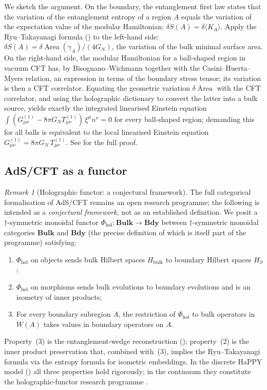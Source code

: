 \documentclass[12pt]{article}
\theoremstyle{definition}
\theoremstyle{remark}
\newtheorem{remark}[theorem]{Remark}
\newcommand{\Area}{\operatorname{Area}}
\begin{document}
We sketch the argument. On the boundary, the entanglement first law states that the variation of the entanglement entropy of a region $A$ equals the variation of the expectation value of the modular Hamiltonian: $\delta S(A) = \delta \langle K_A\rangle$. Apply the Ryu--Takayanagi formula () to the left-hand side: $\delta S(A) = \delta\Area(\gamma_A)/(4G_N)$, the variation of the bulk minimal surface area. On the right-hand side, the modular Hamiltonian for a ball-shaped region in vacuum CFT has, by Bisognano--Wichmann together with the Casini--Huerta--Myers \cite{casini2011} relation, an expression in terms of the boundary stress tensor; its variation is then a CFT correlator. Equating the geometric variation $\delta \Area$ with the CFT correlator, and using the holographic dictionary to convert the latter into a bulk source, yields exactly the integrated linearised Einstein equation $\int (G^{(1)}_{\mu\nu} - 8\pi G_N T^{(1)}_{\mu\nu})\,\xi^\mu n^\nu = 0$ for every ball-shaped region; demanding this for all balls is equivalent to the local linearised Einstein equation $G^{(1)}_{\mu\nu} = 8\pi G_N\, T^{(1)}_{\mu\nu}$. See \cite{fghmv2014} for the full proof.

\subsection{AdS/CFT as a functor}
\label{sec:functor-adscft}

\begin{remark}[Holographic functor: a conjectural framework]
\label{rem:hol-functor}
The full categorical formalisation of AdS/CFT \cite{maldacena1997} remains an open research programme; the following is intended as a \emph{conjectural framework}, not as an established definition. We posit a $\dagger$-symmetric monoidal functor $\Phi_{\mathrm{hol}}\colon \mathbf{Bulk} \to \mathbf{Bdy}$ between $\dagger$-symmetric monoidal categories $\mathbf{Bulk}$ and $\mathbf{Bdy}$ (the precise definition of which is itself part of the programme) satisfying:
\begin{enumerate}
  \item $\Phi_{\mathrm{hol}}$ on objects sends bulk Hilbert spaces $H_{\mathrm{bulk}}$ to boundary Hilbert spaces $H_{\partial}$;
  \item $\Phi_{\mathrm{hol}}$ on morphisms sends bulk evolutions to boundary evolutions and is an isometry of inner products;
  \item For every boundary subregion $A$, the restriction of $\Phi_{\mathrm{hol}}$ to bulk operators in $W(A)$ takes values in boundary operators on $A$.
\end{enumerate}
Property~(3) is the entanglement-wedge reconstruction (); property~(2) is the inner product preservation that, combined with~(3), implies the Ryu--Takayanagi formula via the entropy formula for isometric embeddings. In the discrete HaPPY model () all three properties hold rigorously; in the continuum they constitute the holographic-functor research programme \cite{harlow2017,almheiridongharlow2015}.
\end{remark}
\end{document}
